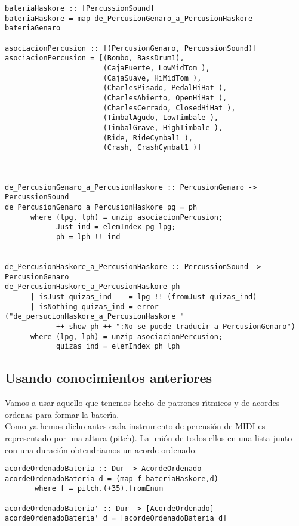 \small
\begin{verbatim}
bateriaHaskore :: [PercussionSound]
bateriaHaskore = map de_PercusionGenaro_a_PercusionHaskore bateriaGenaro

asociacionPercusion :: [(PercusionGenaro, PercussionSound)]
asociacionPercusion = [(Bombo, BassDrum1),
                       (CajaFuerte, LowMidTom ),
                       (CajaSuave, HiMidTom ),
                       (CharlesPisado, PedalHiHat ),
                       (CharlesAbierto, OpenHiHat ),
                       (CharlesCerrado, ClosedHiHat ),
                       (TimbalAgudo, LowTimbale ),
                       (TimbalGrave, HighTimbale ),
                       (Ride, RideCymbal1 ),
                       (Crash, CrashCymbal1 )]



de_PercusionGenaro_a_PercusionHaskore :: PercusionGenaro -> PercussionSound
de_PercusionGenaro_a_PercusionHaskore pg = ph
      where (lpg, lph) = unzip asociacionPercusion;
            Just ind = elemIndex pg lpg;
            ph = lph !! ind


de_PercusionHaskore_a_PercusionHaskore :: PercussionSound -> PercusionGenaro
de_PercusionHaskore_a_PercusionHaskore ph 
      | isJust quizas_ind    = lpg !! (fromJust quizas_ind)
      | isNothing quizas_ind = error ("de_persucionHaskore_a_PercusionHaskore " 
            ++ show ph ++ ":No se puede traducir a PercusionGenaro")
      where (lpg, lph) = unzip asociacionPercusion;
            quizas_ind = elemIndex ph lph
\end{verbatim}
\normalsize

\subsection{Usando conocimientos anteriores}
Vamos a usar aquello que tenemos hecho de patrones r\'\i tmicos y de acordes ordenas
para formar la bater\'\i a.\\
\indent Como ya hemos dicho antes cada instrumento de percusi\'on de MIDI es representado
por una altura (pitch). La uni\'on de todos ellos en una lista
junto con una duraci\'on obtendriamos un acorde ordenado:

\small
\begin{verbatim}
acordeOrdenadoBateria :: Dur -> AcordeOrdenado
acordeOrdenadoBateria d = (map f bateriaHaskore,d)
       where f = pitch.(+35).fromEnum

acordeOrdenadoBateria' :: Dur -> [AcordeOrdenado]
acordeOrdenadoBateria' d = [acordeOrdenadoBateria d]
\end{verbatim}
\normalsize

